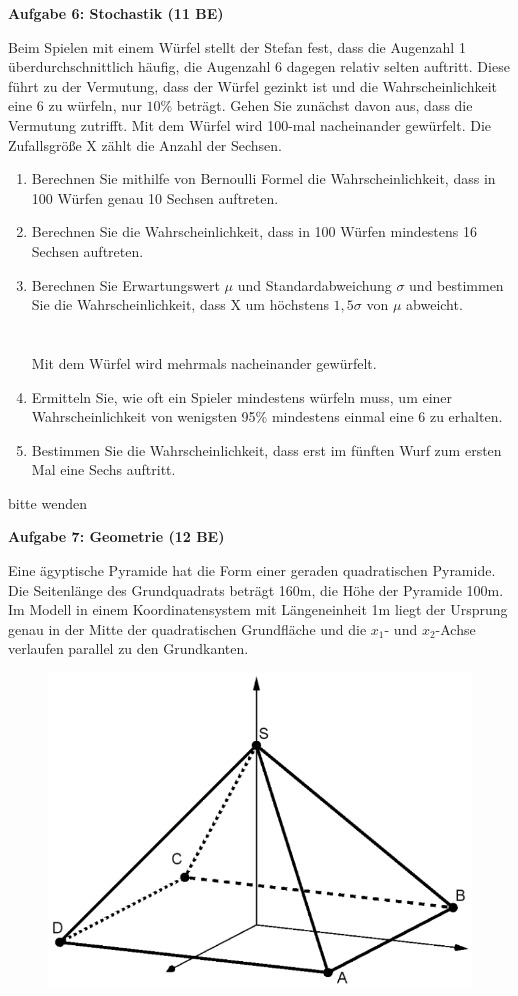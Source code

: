 \documentclass[a4paper,12pt]{article}
\newcommand{\Aufgabe}[1]{
  {
  \vspace*{0.5cm}
  \textsf{\textbf{Aufgabe #1}}
  \vspace*{0.2cm}
  
  }
}
\begin{document}
\vspace{1cm}
\Aufgabe{6: Stochastik (11 BE)}
Beim Spielen mit einem Würfel stellt der Stefan fest, dass die Augenzahl 1 überdurchschnittlich häufig, die Augenzahl 6 dagegen relativ selten auftritt. Diese führt zu der Vermutung, dass der Würfel gezinkt ist und die Wahrscheinlichkeit eine 6 zu würfeln, nur $10\%$ beträgt. Gehen Sie zunächst davon aus, dass die Vermutung zutrifft.
Mit dem Würfel wird 100-mal nacheinander gewürfelt. Die Zufallsgröße X zählt die Anzahl der Sechsen.
\begin{enumerate}[label={\alph*)}]


\item Berechnen Sie mithilfe von Bernoulli Formel  die Wahrscheinlichkeit, dass in 100 Würfen genau 10 Sechsen auftreten.
\item Berechnen Sie die Wahrscheinlichkeit, dass in 100 Würfen mindestens 16 Sechsen auftreten.
\item Berechnen Sie Erwartungswert $\mu$ und Standardabweichung $\sigma$ und bestimmen Sie die Wahrscheinlichkeit, dass X um höchstens $1,5 \sigma$ von $ \mu$ abweicht.\\
\\
\\
Mit dem Würfel wird mehrmals nacheinander gewürfelt.
\item Ermitteln Sie, wie oft ein Spieler mindestens würfeln muss, um einer Wahrscheinlichkeit von wenigsten 95\% mindestens einmal eine 6 zu erhalten.
\item Bestimmen Sie die Wahrscheinlichkeit, dass erst im fünften Wurf zum ersten Mal eine Sechs auftritt.
\end{enumerate}

\vspace{2cm} 
\begin{flushright}bitte wenden \end{flushright}


\newpage
\vspace*{-4\baselineskip}

\enlargethispage{1,5cm}
\Aufgabe{7: Geometrie (12 BE)}
Eine ägyptische Pyramide hat die Form einer geraden quadratischen Pyramide. Die Seitenlänge des Grundquadrats beträgt 160m, die Höhe der Pyramide 100m. Im Modell in einem Koordinatensystem mit Längeneinheit 1m liegt der Ursprung genau in der Mitte der quadratischen Grundfläche und die $x_1$- und $x_2$-Achse verlaufen parallel zu den Grundkanten. 

  \begin{figure}[H]
    \centering
    \includegraphics[width=0.5\columnwidth]{210227_pyramide.png}
  \end{figure}
\end{document}

